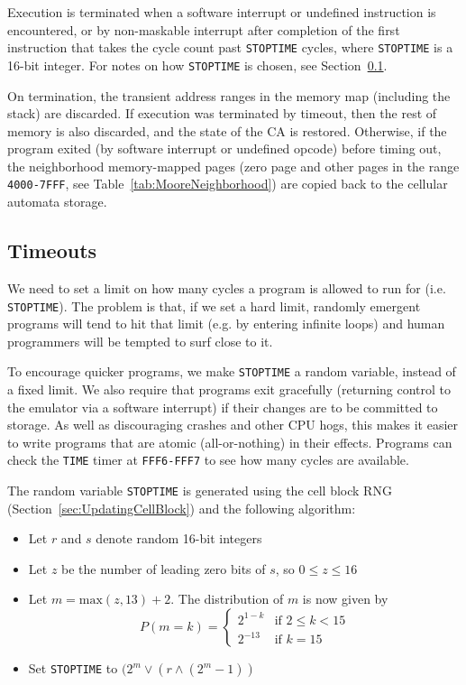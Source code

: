 \documentclass{article}
\newcommand\code[1]{{\tt #1}}
\newcommand\hex[1]{{\tt #1}}
\newcommand\hexrange[2]{\hex{#1}{\tt -}\hex{#2}}
\begin{document}
Execution is terminated
when a software interrupt or undefined instruction is encountered,
or by non-maskable interrupt after completion of the first instruction that takes the cycle count past \code{STOPTIME} cycles,
where \code{STOPTIME} is a 16-bit integer.
For notes on how \code{STOPTIME} is chosen, see Section~\ref{sec:Timeouts}.

On termination, the transient address ranges in the memory map
(including the stack) are discarded.
If execution was terminated by timeout, then the rest of memory is also discarded,
and the state of the CA is restored.
Otherwise, if the program exited (by software interrupt or undefined opcode) before timing out,
the neighborhood memory-mapped pages (zero page and other pages in the range \hexrange{4000}{7FFF}, see Table~\ref{tab:MooreNeighborhood})
are copied back to the cellular automata storage.

\subsection{Timeouts}
\label{sec:Timeouts}

We need to set a limit on how many cycles a program is allowed to run for (i.e. \code{STOPTIME}).
The problem is that, if we set a hard limit, randomly emergent programs will tend to hit that limit
(e.g. by entering infinite loops)
and human programmers will be tempted to surf close to it.

To encourage quicker programs,
we make \code{STOPTIME} a random variable, instead of a fixed limit.
We also require that programs exit gracefully (returning control to the emulator via a software interrupt)
if their changes are to be committed to storage.
As well as discouraging crashes and other CPU hogs, this makes it easier to write programs that are atomic (all-or-nothing) in their effects.
Programs can check the \code{TIME} timer at \hexrange{FFF6}{FFF7} to see how many cycles are available.

The random variable \code{STOPTIME} is generated using the cell block RNG (Section~\ref{sec:UpdatingCellBlock})
and the following algorithm:
\begin{itemize}
\item Let $r$ and $s$ denote random 16-bit integers
\item Let $z$ be the number of leading zero bits of $s$, so $0 \leq z \leq 16$
\item Let $m = \mbox{max}(z,13) + 2$. The distribution of $m$ is now given by
  \[
  P(m=k) = \left\{ \begin{array}{ll} 2^{1-k} & \mbox{if $2 \leq k < 15$} \\ 2^{-13} & \mbox{if $k = 15$} \end{array} \right.
  \]
\item Set \code{STOPTIME} to $(2^m \vee (r \wedge (2^m - 1))$
\end{itemize}
\end{document}
